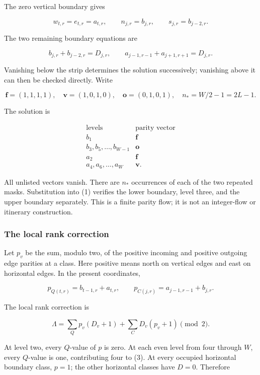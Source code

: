 \documentclass[11pt,letterpaper]{article}
\theoremstyle{plain}
\theoremstyle{definition}
\begin{document}
\begin{NoHyper}
The zero vertical boundary gives

\[
w_{t,r}=e_{t,r}=a_{t,r},\qquad
n_{j,r}=b_{j,r},\qquad s_{j,r}=b_{j-2,r}.
\]

The two remaining boundary equations are

\[
b_{j,r}+b_{j-2,r}=D_{j,r},\qquad
a_{j-1,r-1}+a_{j+1,r+1}=D_{j,r}.
\tag{1}
\]

Vanishing below the strip determines the solution successively; vanishing above it can then be checked directly. Write

\[
\mathbf f=(1,1,1,1),\quad
\mathbf v=(1,0,1,0),\quad
\mathbf o=(0,1,0,1),\quad
n_* = W/2-1=2L-1.
\]

The solution is

\[
\begin{array}{c|c}
\text{levels}&\text{parity vector}\\ \hline
b_1&\mathbf f\\
b_3,b_5,\ldots,b_{W-1}&\mathbf o\\
a_2&\mathbf f\\
a_4,a_6,\ldots,a_W&\mathbf v.
\end{array}
\tag{2}
\]

All unlisted vectors vanish. There are \(n_*\) occurrences of each of the two repeated masks. Substitution into (1) verifies the lower boundary, level three, and the upper boundary separately. This is a finite parity flow; it is not an integer-flow or itinerary construction.

\subsubsection{The local rank correction}

Let \(p_v\) be the sum, modulo two, of the positive incoming and positive outgoing edge parities at a class. Here positive means north on vertical edges and east on horizontal edges. In the present coordinates,

\[
p_{Q(t,r)}=b_{t-1,r}+a_{t,r},\qquad
p_{C(j,r)}=a_{j-1,r-1}+b_{j,r}.
\]

The local rank correction is

\[
\Lambda=\sum_Q p_v(D_v+1)+\sum_C D_v(p_v+1)\pmod2.
\tag{3}
\]

At level two, every \(Q\)-value of \(p\) is zero. At each even level from four through \(W\), every \(Q\)-value is one, contributing four to (3). At every occupied horizontal boundary class, \(p=1\); the other horizontal classes have \(D=0\). Therefore


\end{NoHyper}
\end{document}
